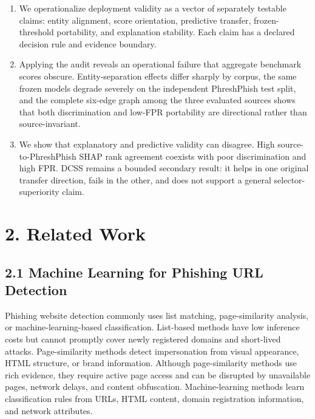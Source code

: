 \documentclass[
  10pt,
]{article}
\providecommand{\tightlist}{%
  \setlength{\itemsep}{0pt}\setlength{\parskip}{0pt}}
\begin{document}
\begin{enumerate}
\def\labelenumi{\arabic{enumi}.}
\tightlist
\item
  We operationalize deployment validity as a vector of separately
  testable claims: entity alignment, score orientation, predictive
  transfer, frozen-threshold portability, and explanation stability.
  Each claim has a declared decision rule and evidence boundary.
\item
  Applying the audit reveals an operational failure that aggregate
  benchmark scores obscure. Entity-separation effects differ sharply by
  corpus, the same frozen models degrade severely on the independent
  PhreshPhish test split, and the complete six-edge graph among the
  three evaluated sources shows that both discrimination and low-FPR
  portability are directional rather than source-invariant.
\item
  We show that explanatory and predictive validity can disagree. High
  source-to-PhreshPhish SHAP rank agreement coexists with poor
  discrimination and high FPR. DCSS remains a bounded secondary result:
  it helps in one original transfer direction, fails in the other, and
  does not support a general selector-superiority claim.
\end{enumerate}

\section{2. Related Work}\label{related-work}

\subsection{2.1 Machine Learning for Phishing URL
Detection}\label{machine-learning-for-phishing-url-detection}

Phishing website detection commonly uses list matching, page-similarity
analysis, or machine-learning-based classification\citep{Zieni2023}.
List-based methods have low inference costs but cannot promptly cover
newly registered domains and short-lived attacks. Page-similarity
methods detect impersonation from visual appearance, HTML structure, or
brand information. Although page-similarity methods use rich evidence,
they require active page access and can be disrupted by unavailable
pages, network delays, and content obfuscation. Machine-learning methods
learn classification rules from URLs, HTML content, domain registration
information, and network attributes.
\end{document}
